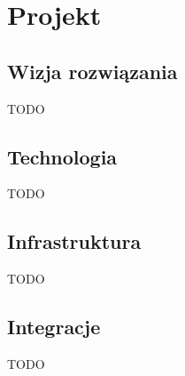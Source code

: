 
\chapter{Projekt}
\label{ch:projekt}

\section{Wizja rozwiązania}
\label{sec:wizja-rozwiazania}

TODO

\section{Technologia}
\label{sec:technologia}

TODO

\section{Infrastruktura}
\label{sec:infrastruktura}

TODO

\section{Integracje}
\label{sec:integracje}

TODO
